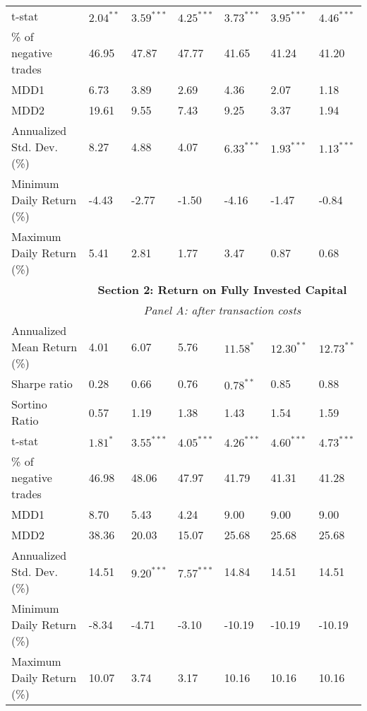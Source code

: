 \documentclass[a4paper]{article}
\begin{document}
\begin{threeparttable}[H]
\begin{tabularx}{\textwidth}{@{\extracolsep{\fill}}lllllll@{}}
		t-stat & $2.04^{**}$  & $3.59^{***}$  & $4.25^{***}$  & $3.73^{***}$  & $3.95^{***}$  & $4.46^{***}$ \\
		\% of negative trades & 46.95 & 47.87 & 47.77 & 41.65 & 41.24 & 41.20 \\
		MDD1  & 6.73  & 3.89  & 2.69  & 4.36  & 2.07  & 1.18 \\
		MDD2  & 19.61 & 9.55  & 7.43  & 9.25  & 3.37  & 1.94 \\
		Annualized Std. Dev. (\%) & 8.27  & 4.88  & 4.07  & $6.33^{***}$  & $1.93^{***}$  & $1.13^{***}$ \\
		Minimum Daily Return (\%) & -4.43 & -2.77 & -1.50 & -4.16 & -1.47 & -0.84 \\
		Maximum Daily Return (\%) & 5.41  & 2.81  & 1.77  & 3.47  & 0.87  & 0.68 \\
		\midrule
& \multicolumn{6}{c}{\textbf{Section 2: Return on Fully Invested Capital}} \\
& \multicolumn{6}{c}{\textit {Panel A: after transaction costs}} \\
		Annualized Mean Return (\%) & 4.01  & 6.07  & 5.76  & $11.58^{*}$ & $12.30^{**}$ & $12.73^{**}$ \\
		Sharpe ratio & 0.28  & 0.66  & 0.76  & $0.78^{**}$  & 0.85  & 0.88 \\
		Sortino Ratio & 0.57  & 1.19  & 1.38  & 1.43  & 1.54  & 1.59 \\
		t-stat & $1.81^{*}$  & $3.55^{***}$  & $4.05^{***}$  & $4.26^{***}$  & $4.60^{***}$  & $4.73^{***}$ \\
		\% of negative trades & 46.98 & 48.06 & 47.97 & 41.79 & 41.31 & 41.28 \\
		MDD1  & 8.70  & 5.43  & 4.24  & 9.00  & 9.00  & 9.00 \\
		MDD2  & 38.36 & 20.03 & 15.07 & 25.68 & 25.68 & 25.68 \\
		Annualized Std. Dev. (\%) & 14.51 & $9.20^{***}$  & $7.57^{***}$  & 14.84 & 14.51 & 14.51 \\
		Minimum Daily Return (\%) & -8.34 & -4.71 & -3.10 & -10.19 & -10.19 & -10.19 \\
		Maximum Daily Return (\%) & 10.07 & 3.74  & 3.17  & 10.16 & 10.16 & 10.16 \\

\end{tabularx}
\end{threeparttable}
\end{document}
